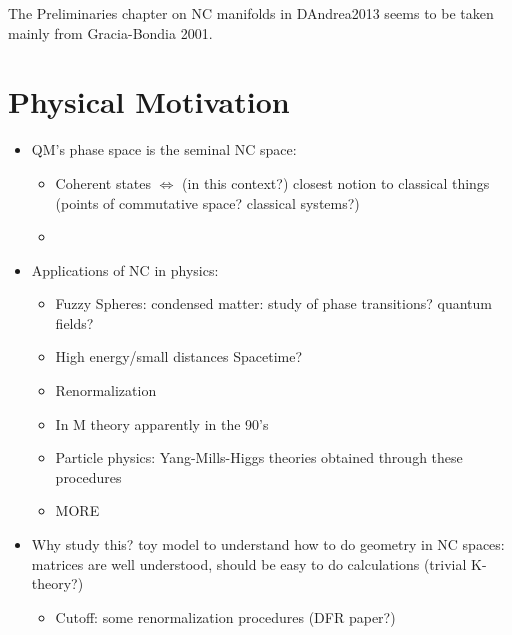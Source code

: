 The Preliminaries chapter on NC manifolds in DAndrea2013 seems to be taken mainly from Gracia-Bondia 2001.

\section{Physical Motivation}

    \begin{itemize}
        
    \item QM's phase space is the seminal NC space: 
    
        \begin{itemize}
            
        \item Coherent states $\iff$ (in this context?) closest notion to classical things (points of commutative space? classical systems?)
        
        \item 
            
        \end{itemize}
    
    \item Applications of NC in physics:
    
        \begin{itemize}
            
        \item Fuzzy Spheres: condensed matter: study of phase transitions? quantum fields?
        
        \item High energy/small distances Spacetime? 
        
        \item Renormalization
    
        \item In M theory apparently in the 90's 
    
        \item Particle physics: Yang-Mills-Higgs theories obtained through these procedures
        
        \item MORE
            
        \end{itemize}
   
   \item Why study this? toy model to understand how to do geometry in NC spaces: matrices are well understood, should be easy to do calculations (trivial K-theory?)
   
        \begin{itemize}
            
        \item Cutoff: some renormalization procedures (DFR paper?)
            
        \end{itemize}
    
    \end{itemize}

